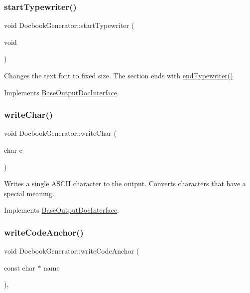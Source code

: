 \subsubsection{\texorpdfstring{startTypewriter()}{startTypewriter()}}
{\footnotesize\ttfamily void Docbook\+Generator\+::start\+Typewriter (\begin{DoxyParamCaption}\item[{void}]{ }\end{DoxyParamCaption})\hspace{0.3cm}{\ttfamily [virtual]}}

Changes the text font to fixed size. The section ends with \mbox{\hyperlink{class_docbook_generator_a2b987c6b42a8a5b5cea28f950fefa6cc}{end\+Typewriter()}} 

Implements \mbox{\hyperlink{class_base_output_doc_interface_abde41a60b900d35b0b198f43731c1cd0}{Base\+Output\+Doc\+Interface}}.

\mbox{\label{class_docbook_generator_ab075c899a62994272a1f542404ec614d}} 
\subsubsection{\texorpdfstring{writeChar()}{writeChar()}}
{\footnotesize\ttfamily void Docbook\+Generator\+::write\+Char (\begin{DoxyParamCaption}\item[{char}]{c }\end{DoxyParamCaption})\hspace{0.3cm}{\ttfamily [virtual]}}

Writes a single A\+S\+C\+II character to the output. Converts characters that have a special meaning. 

Implements \mbox{\hyperlink{class_base_output_doc_interface_a1577324720c1c71142dff84ae80b058d}{Base\+Output\+Doc\+Interface}}.

\mbox{\label{class_docbook_generator_a7fc22eda4420a580d40a7fa2624209b6}} 
\subsubsection{\texorpdfstring{writeCodeAnchor()}{writeCodeAnchor()}}
{\footnotesize\ttfamily void Docbook\+Generator\+::write\+Code\+Anchor (\begin{DoxyParamCaption}\item[{const char $\ast$}]{name }\end{DoxyParamCaption})\hspace{0.3cm}{\ttfamily [inline]}, {\ttfamily [virtual]}}

